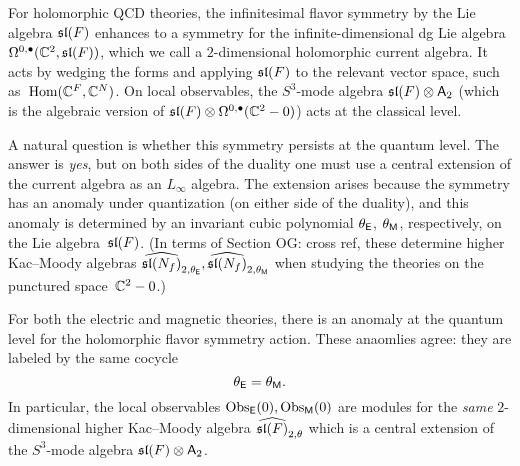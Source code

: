 \documentclass[11pt]{amsart}
\def\SU{{\rm SU}}
\def\lie#1{\ensuremath{\mathfrak{#1}}}
\def\owen#1{{\textcolor{violet!65!black}{OG: {#1}}}}
\begin{document}
%
%
%

For holomorphic QCD theories, the infinitesimal flavor symmetry by the Lie algebra $\sl(F)$ enhances to a symmetry for the infinite-dimensional dg Lie algebra $\Omega^{0,\bu}(\CC^2, \sl(F))$, 
which we call a $2$-dimensional holomorphic current algebra.
It acts by wedging the forms and applying $\sl(F)$ to the relevant vector space, such as~$\Hom(\CC^F,\CC^N)$.
On local observables, the $S^3$-mode algebra $\lie{sl}(F) \otimes \sfA_2$ (which is the algebraic version of $\sl(F) \otimes \Omega^{0,\bu}(\CC^2 - 0)$) acts at the classical level.

A natural question is whether this symmetry persists at the quantum level. 
The answer is {\em yes}, but on both sides of the duality one must use a central extension of the current algebra as an $L_\infty$ algebra.
The extension arises because the symmetry has an anomaly under quantization (on either side of the duality),
and this anomaly is determined by an  invariant cubic polynomial $\theta_\sfE$, $\theta_\sfM$, respectively, on the Lie algebra~$\sl(F)$. 
(In terms of Section \owen{cross ref}, these determine higher Kac--Moody algebras $\Hat{\sl(N_f)}_{2,\theta_{\sfE}}, \Hat{\sl(N_f)}_{2,\theta_{\sfM}}$ when studying the theories on the punctured space~$\CC^2 - 0$.)

\begin{prop}
For both the electric and magnetic theories, there is an anomaly at the quantum level for the holomorphic flavor symmetry action.
These anaomlies agree: they are labeled by the same cocycle 
\[
\theta_\sfE = \theta_\sfM.
\] 
In particular, the local observables $\Obs_{\sfE} (0), \Obs_{\sfM} (0)$ are modules for the {\em same} $2$-dimensional higher Kac--Moody algebra $\Hat{\sl(F)}_{2,\theta}$ which is a central extension of the $S^3$-mode algebra $\sl(F) \otimes \sfA_2$.
\end{prop}
\end{document}

